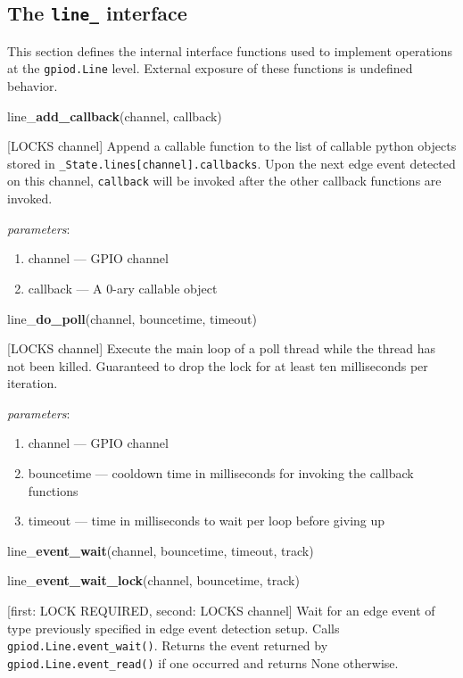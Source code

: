 \documentclass[12pt]{article}
\begin{document}
\subsection{The \texttt{line\_} interface}

This section defines the internal interface functions used to implement operations at the \texttt{gpiod.Line} level. External exposure of these functions is undefined behavior.

\medskip

\noindent line\_\textbf{add\_callback}(channel, callback)

[LOCKS channel] Append a callable function to the list of callable python objects stored in \texttt{\_State.lines[channel].callbacks}. Upon the next edge event detected on this channel, \texttt{callback} will be invoked after the other callback functions are invoked. 

\textit{parameters}:
\begin{enumerate}      
        \item channel --- GPIO channel
        \item callback --- A 0-ary callable object
\end{enumerate}

\noindent line\_\textbf{do\_poll}(channel, bouncetime, timeout)

[LOCKS channel] Execute the main loop of a poll thread while the thread has not been killed. Guaranteed to drop the lock for at least ten milliseconds per iteration.

\textit{parameters}:
\begin{enumerate}      
        \item channel --- GPIO channel
        \item bouncetime --- cooldown time in milliseconds for invoking the callback functions
        \item timeout --- time in milliseconds to wait per loop before giving up
\end{enumerate}

\noindent line\_\textbf{event\_wait}(channel, bouncetime, timeout, track)

\noindent line\_\textbf{event\_wait\_lock}(channel, bouncetime, track)

[first: LOCK REQUIRED, second: LOCKS channel]
Wait for an edge event of type previously specified in edge event detection setup. Calls \texttt{gpiod.Line.event\_wait()}. Returns the event returned by \texttt{gpiod.Line.event\_read()} if one occurred and returns None otherwise. 
\end{document}
